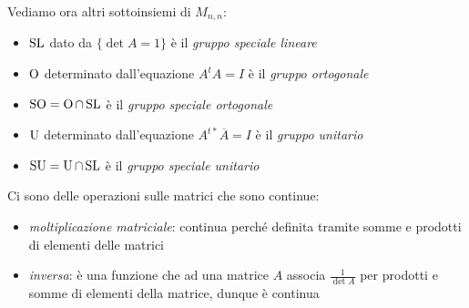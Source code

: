 Vediamo ora altri sottoinsiemi di $M_{n,n}$:
	\begin{itemize}
		\item $\operatorname{SL}$ dato da $\{\det A=1\} $ è il \textit{gruppo speciale lineare}
		\item $\operatorname{O}$ determinato dall'equazione $A^{t}A=I$ è il \textit{gruppo ortogonale}
		\item $\operatorname{SO}=\operatorname{O}\cap\operatorname{SL}$ è il \textit{gruppo speciale ortogonale}
		\item $\operatorname{U}$ determinato dall'equazione $A^{t*}\overline{A}=I$ è il \textit{gruppo unitario}
		\item $\operatorname{SU}=\operatorname{U}\cap\operatorname{SL}$ è il \textit{gruppo speciale unitario}
	\end{itemize}

Ci sono delle operazioni sulle matrici che sono continue:
	\begin{itemize}
		\item \textit{moltiplicazione matriciale}: continua perché definita tramite somme e prodotti di elementi delle matrici
		\item \textit{inversa}: è una funzione che ad una matrice $A$ associa $\displaystyle \frac{1}{\det A}$ per prodotti e somme di elementi della matrice, dunque è continua
	\end{itemize}

